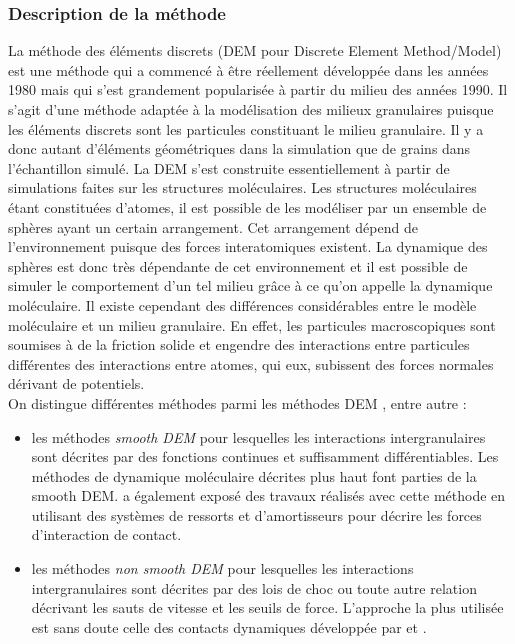 		\subsubsection{Description de la méthode}
			La méthode des éléments discrets (DEM pour Discrete Element Method/Model) est une méthode qui a commencé à être réellement développée dans les années 1980 \citep{cundall_discrete_1979} mais qui s'est grandement popularisée à partir du milieu des années 1990. Il s'agit d'une méthode adaptée à la modélisation des milieux granulaires puisque les éléments discrets sont les particules constituant le milieu granulaire. Il y a donc autant d'éléments géométriques dans la simulation que de grains dans l'échantillon simulé. La DEM s'est construite essentiellement à partir de simulations faites sur les structures moléculaires. Les structures moléculaires étant constituées d'atomes, il est possible de les modéliser par un ensemble de sphères ayant un certain arrangement. Cet arrangement dépend de l'environnement puisque des forces interatomiques existent. La dynamique des sphères est donc très dépendante de cet environnement et il est possible de simuler le comportement d'un tel milieu grâce à ce qu'on appelle la dynamique moléculaire. Il existe cependant des différences considérables entre le modèle moléculaire et un milieu granulaire. En effet, les particules macroscopiques sont soumises à de la friction solide et engendre des interactions entre particules différentes des interactions entre atomes, qui eux, subissent des forces normales dérivant de potentiels.
			\\On distingue différentes méthodes parmi les méthodes DEM \citep{cambou_micromechanics_2009}, entre autre :
			\begin{itemize}
				\item les méthodes \emph{smooth DEM} pour lesquelles les interactions intergranulaires sont décrites par des fonctions continues et suffisamment différentiables. Les méthodes de dynamique moléculaire décrites plus haut font parties de la smooth DEM. \citet{cundall_discrete_1979} a également exposé des travaux réalisés avec cette méthode en utilisant des systèmes de ressorts et d'amortisseurs pour décrire les forces d'interaction de contact.
				\item les méthodes \emph{non smooth DEM} pour lesquelles les interactions intergranulaires sont décrites par des lois de choc ou toute autre relation décrivant les sauts de vitesse et les seuils de force. L'approche la plus utilisée est sans doute celle des contacts dynamiques développée par \citet{moreau_unilateral_1988} et \citet{jean_unilaterality_1992}.
			\end{itemize}
